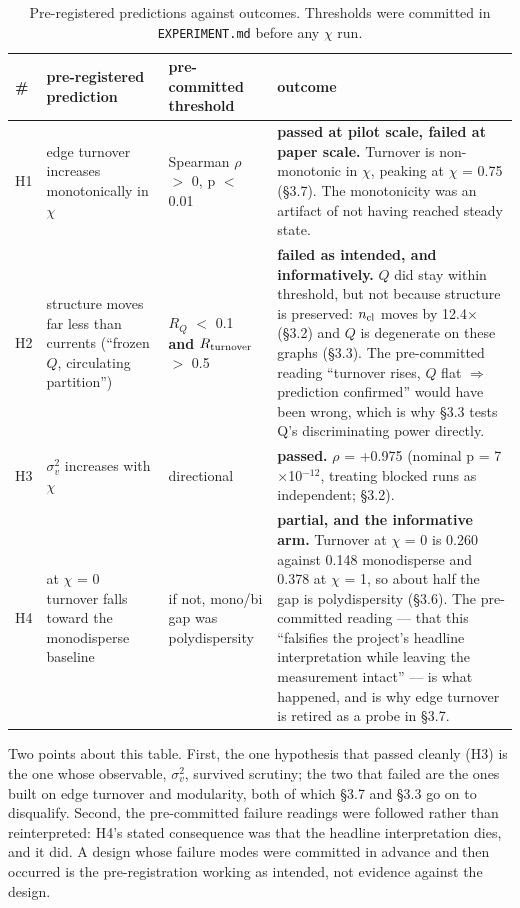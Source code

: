 \documentclass[aps,pre,preprint,superscriptaddress,nofootinbib,longbibliography]{revtex4-2}
\begin{document}
\begin{table}[htbp]
\caption{Pre-registered predictions against outcomes. Thresholds were committed in \texttt{EXPERIMENT.md} before any $\chi$ run.}
\label{tab:23}
\begin{ruledtabular}
\begin{tabular}{p{1.00cm}p{3.26cm}p{2.74cm}p{7.27cm}}
\raggedright
\# & pre-registered prediction & pre-committed threshold & outcome \\
\hline
H1 & edge turnover increases monotonically in $\chi$ & Spearman $\rho$ $>$ 0, p $<$ 0.01 & \textbf{passed at pilot scale, failed at paper scale.} Turnover is non-monotonic in $\chi$, peaking at $\chi$ = 0.75 (\S{}3.7). The monotonicity was an artifact of not having reached steady state. \\
H2 & structure moves far less than currents (``frozen $Q$, circulating partition'') & $R_{Q}$ $<$ 0.1 \textbf{and} $R_{\rm turnover}$ $>$ 0.5 & \textbf{failed as intended, and informatively.} $Q$ did stay within threshold, but not because structure is preserved: $n_{\rm cl}$ moves by 12.4$\times$ (\S{}3.2) and $Q$ is degenerate on these graphs (\S{}3.3). The pre-committed reading ``turnover rises, $Q$ flat $\Rightarrow$ prediction confirmed'' would have been wrong, which is why \S{}3.3 tests Q's discriminating power directly. \\
H3 & $\sigma^2_v$ increases with $\chi$ & directional & \textbf{passed.} $\rho$ = +0.975 (nominal p = 7$\times$10$^{-12}$, treating blocked runs as independent; \S{}3.2). \\
H4 & at $\chi$ = 0 turnover falls toward the monodisperse baseline & if not, mono/bi gap was polydispersity & \textbf{partial, and the informative arm.} Turnover at $\chi$ = 0 is 0.260 against 0.148 monodisperse and 0.378 at $\chi$ = 1, so about half the gap is polydispersity (\S{}3.6). The pre-committed reading --- that this ``falsifies the project's headline interpretation while leaving the measurement intact'' --- is what happened, and is why edge turnover is retired as a probe in \S{}3.7. \\
\end{tabular}
\end{ruledtabular}
\end{table}

Two points about this table. First, the one hypothesis that passed cleanly (H3) is the one whose observable, $\sigma^2_v$, survived scrutiny; the two that failed are the ones built on edge turnover and modularity, both of which \S{}3.7 and \S{}3.3 go on to disqualify. Second, the pre-committed failure readings were followed rather than reinterpreted: H4's stated consequence was that the headline interpretation dies, and it did. A design whose failure modes were committed in advance and then occurred is the pre-registration working as intended, not evidence against the design.
\end{document}
